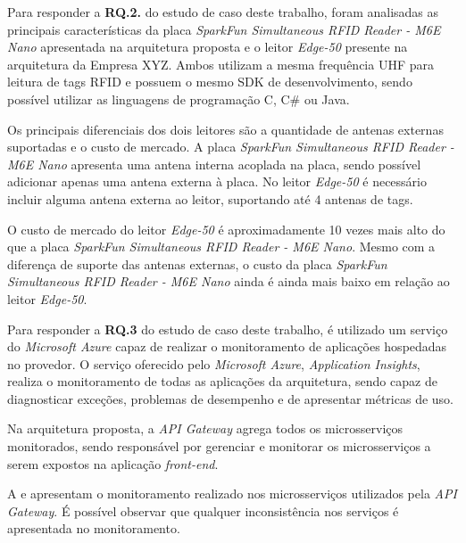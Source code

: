 Para responder a \textbf{RQ.2.} do estudo de caso deste trabalho, foram analisadas as principais características da placa \textit{SparkFun Simultaneous RFID Reader - M6E Nano} apresentada na arquitetura proposta e o leitor \textit{Edge-50} presente na arquitetura da Empresa XYZ. Ambos utilizam a mesma frequência \acrshort{UHF} para leitura de tags \acrshort{RFID} e possuem o mesmo \acrshort{SDK} de desenvolvimento, sendo possível utilizar as linguagens de programação C, C\# ou Java.

\newpage

Os principais diferenciais dos dois leitores são a quantidade de antenas externas suportadas e o custo de mercado. A placa \textit{SparkFun Simultaneous RFID Reader - M6E Nano} apresenta uma antena interna acoplada na placa, sendo possível adicionar apenas uma antena externa à placa. No leitor \textit{Edge-50} é necessário incluir alguma antena externa ao leitor, suportando até 4 antenas de tags.

O custo de mercado do leitor \textit{Edge-50} é aproximadamente 10 vezes mais alto do que a placa \textit{SparkFun Simultaneous RFID Reader - M6E Nano}. Mesmo com a diferença de suporte das antenas externas, o custo da placa \textit{SparkFun Simultaneous RFID Reader - M6E Nano} ainda é ainda mais baixo em relação ao leitor \textit{Edge-50}.

Para responder a \textbf{RQ.3} do estudo de caso deste trabalho, é utilizado um serviço do \textit{Microsoft Azure} capaz de realizar o monitoramento de aplicações hospedadas no provedor. O serviço oferecido pelo \textit{Microsoft Azure}, \textit{Application Insights}, realiza o monitoramento de todas as aplicações da arquitetura, sendo capaz de diagnosticar exceções, problemas de desempenho e de apresentar métricas de uso.

Na arquitetura proposta, a \textit{API Gateway} agrega todos os microsserviços monitorados, sendo responsável por gerenciar e monitorar os microsserviços a serem expostos na aplicação \textit{front-end}.

A  e  apresentam o monitoramento realizado nos microsserviços utilizados pela \textit{API Gateway}. É possível observar que qualquer inconsistência nos serviços é apresentada no monitoramento.

\newpage


